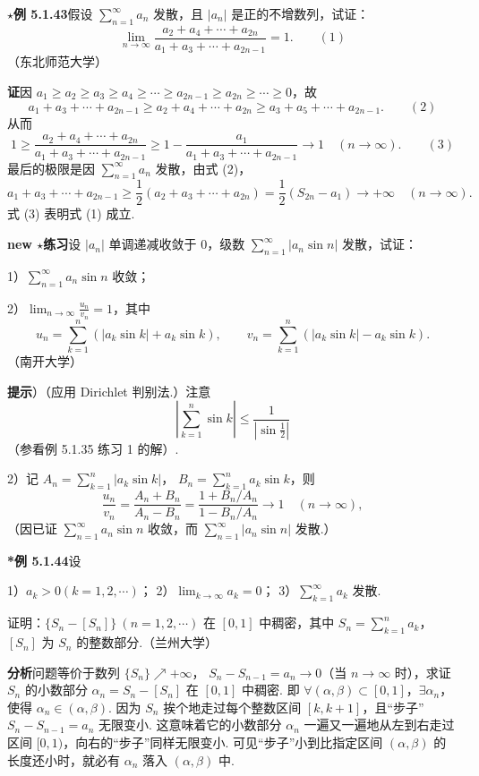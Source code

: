 \documentclass[UTF8, 12pt, fontset=fandol, oneside]{ctexart}
\begin{document}
\noindent\textbf{$\star$例 5.1.43}\quad 假设 $\displaystyle\sum_{n=1}^{\infty}a_n$ 发散，且 $|a_n|$ 是正的不增数列，试证：
\[
  \lim_{n\to\infty}\frac{a_2+a_4+\cdots+a_{2n}}{a_1+a_3+\cdots+a_{2n-1}}=1.
\qquad(1)
\]
（东北师范大学）

\noindent\textbf{证}\quad 因 $a_1\ge a_2\ge a_3\ge a_4\ge\cdots\ge a_{2n-1}\ge a_{2n}\ge\cdots\ge0$，故
\[
  a_1+a_3+\cdots+a_{2n-1}
  \ge a_2+a_4+\cdots+a_{2n}
  \ge a_3+a_5+\cdots+a_{2n-1}.
\qquad(2)
\]
从而
\[
  1\ge\frac{a_2+a_4+\cdots+a_{2n}}{a_1+a_3+\cdots+a_{2n-1}}
  \ge1-\frac{a_1}{a_1+a_3+\cdots+a_{2n-1}}\to1\quad(n\to\infty).
\qquad(3)
\]
最后的极限是因 $\displaystyle\sum_{n=1}^{\infty}a_n$ 发散，由式 (2)，
\[
  a_1+a_3+\cdots+a_{2n-1}
  \ge\frac12(a_2+a_3+\cdots+a_{2n})
  =\frac12(S_{2n}-a_1)\to+\infty\quad(n\to\infty).
\]
式 (3) 表明式 (1) 成立.

\noindent\textbf{new $\star$练习}\quad 设 $|a_n|$ 单调递减收敛于 $0$，级数 $\displaystyle\sum_{n=1}^{\infty}|a_n\sin n|$ 发散，试证：

1）$\displaystyle\sum_{n=1}^{\infty}a_n\sin n$ 收敛；

2）$\displaystyle\lim_{n\to\infty}\frac{u_n}{v_n}=1$，其中
\[
  u_n=\sum_{k=1}^n(|a_k\sin k|+a_k\sin k),\qquad
  v_n=\sum_{k=1}^n(|a_k\sin k|-a_k\sin k).
\]
（南开大学）

\noindent\textbf{提示}）（应用 Dirichlet 判别法.）注意
\[
  \left|\sum_{k=1}^n\sin k\right|\le\frac1{\left|\sin\frac12\right|}
\]
（参看例 5.1.35 练习 1 的解）.

2）记
$A_n=\displaystyle\sum_{k=1}^n|a_k\sin k|$，
$B_n=\displaystyle\sum_{k=1}^n a_k\sin k$，则
\[
  \frac{u_n}{v_n}
  =\frac{A_n+B_n}{A_n-B_n}
  =\frac{1+B_n/A_n}{1-B_n/A_n}\to1\quad(n\to\infty),
\]
（因已证 $\displaystyle\sum_{n=1}^{\infty}a_n\sin n$ 收敛，而
$\displaystyle\sum_{n=1}^{\infty}|a_n\sin n|$ 发散.）

\noindent\textbf{*例 5.1.44}\quad 设

1）$a_k>0(k=1,2,\cdots)$；
2）$\displaystyle\lim_{k\to\infty}a_k=0$；
3）$\displaystyle\sum_{k=1}^{\infty}a_k$ 发散.

证明：$\{S_n-[S_n]\}\ (n=1,2,\cdots)$ 在 $[0,1]$ 中稠密，其中
$S_n=\displaystyle\sum_{k=1}^n a_k$，$[S_n]$ 为 $S_n$ 的整数部分.（兰州大学）

\noindent\textbf{分析}\quad 问题等价于数列 $\{S_n\}\nearrow+\infty$，
$S_n-S_{n-1}=a_n\to0$（当 $n\to\infty$ 时），求证 $S_n$ 的小数部分
$\alpha_n=S_n-[S_n]$ 在 $[0,1]$ 中稠密. 即 $\forall(\alpha,\beta)\subset[0,1]$，$\exists\alpha_n$，使得
$\alpha_n\in(\alpha,\beta)$. 因为 $S_n$ 挨个地走过每个整数区间 $[k,k+1]$，且“步子”$S_n-S_{n-1}=a_n$ 无限变小. 这意味着它的小数部分 $\alpha_n$ 一遍又一遍地从左到右走过区间 $[0,1)$，向右的“步子”同样无限变小. 可见“步子”小到比指定区间 $(\alpha,\beta)$ 的长度还小时，就必有 $\alpha_n$ 落入 $(\alpha,\beta)$ 中.
\end{document}
